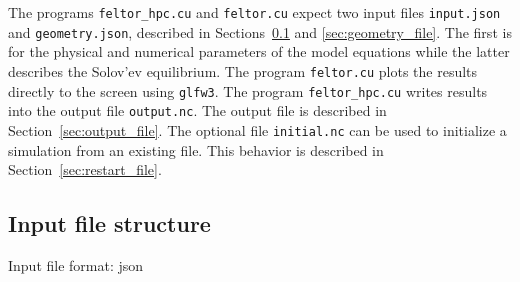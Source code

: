 The programs \texttt{feltor\_hpc.cu} and \texttt{feltor.cu} expect two input
files \texttt{input.json} and \texttt{geometry.json}, described in Sections~\ref{sec:input_file} and \ref{sec:geometry_file}.
The first is for the physical and numerical parameters of the model equations
while the latter describes the Solov'ev equilibrium.
 The program \texttt{feltor.cu} plots the results directly to the screen using \texttt{glfw3}.
The program \texttt{feltor\_hpc.cu} writes results into
the output file \texttt{output.nc}.
 The output file is described in Section~\ref{sec:output_file}.
 The optional file \texttt{initial.nc} can be used to initialize a simulation from an existing file.
 This behavior is described in Section~\ref{sec:restart_file}.


\subsection{Input file structure} \label{sec:input_file}
Input file format: json

